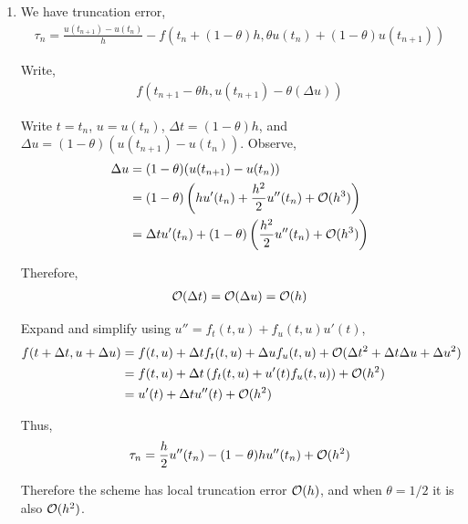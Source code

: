 \documentclass[10pt]{article}
\begin{document}
\begin{solution}[Solution]
\begin{enumerate}[label=(\alph*)]
    \item
        We have truncation error,
        \begin{align*}
            \tau_n = \frac{u(t_{n+1}) - u(t_n)}{h} - f(t_n + (1-\theta) h, \theta u(t_n) + (1-\theta)u(t_{n+1}))
        \end{align*}

        Write,
        \begin{align*}
            f(t_{n+1} - \theta h, u(t_{n+1}) - \theta(\Delta u))
        \end{align*}
        

        Write \( t = t_n \), \( u = u(t_n) \), \( \Delta t = (1-\theta) h \), and \( \Delta u = (1-\theta) (u(t_{n+1}) - u(t_n)) \). 
        Observe,
        \begin{align*}
            \Delta u &= (1-\theta)(u(t_{n+1}) - u(t_n)) \\
            &= (1-\theta)\left( h u'(t_n) + \frac{h^2}{2} u''(t_n) + \mathcal{O}(h^3) \right) \\
            &= \Delta t u'(t_n) + (1-\theta)\left( \frac{h^2}{2} u''(t_n) + \mathcal{O}(h^3) \right)
        \end{align*}
        
        Therefore,
        \begin{align*}
            \mathcal{O}(\Delta t)  = \mathcal{O}(\Delta u) = \mathcal{O}(h) 
        \end{align*}

        Expand and simplify using \( u'' = f_t(t,u) + f_u(t,u)u'(t) \),
        \begin{align*}
            f(t + \Delta t, u + \Delta u)
            &= f(t,u) + \Delta t f_t(t,u) + \Delta u f_u(t,u) + \mathcal{O}(\Delta t^2 + \Delta t\Delta u + \Delta u^2) 
            \\&= f(t,u) + \Delta t \left (f_t(t,u) + u'(t) f_u(t,u) \right) + \mathcal{O}(h^2) 
            \\&= u'(t) + \Delta t u''(t)  + \mathcal{O}(h^2) 
        \end{align*}

        Thus,
        \begin{align*}
            \tau_n = \frac{h}{2}u''(t_n) - (1-\theta) h u''(t_n) + \mathcal{O}(h^2)
        \end{align*}
        
        Therefore the scheme has local truncation error \( \mathcal{O}(h) \), and when \( \theta = 1/2 \) it is also \( \mathcal{O}(h^2) \).


\end{enumerate}
\end{solution}
\end{document}
